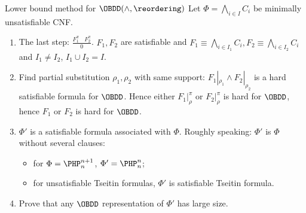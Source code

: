 \begin{frame}{Lower bound method for $\OBDD(\land, \reordering)$}
	Let $\Phi = \bigwedge\limits_{i \in I} C_i$ be minimally unsatisfiable CNF.
    \pause
    \begin{enumerate}
        \item The last step: $\frac{F_1^{\pi} ~~~~ F_2^{\pi}}{0}$. $F_1, F_2$ are satisfiable and
            $F_1 \equiv \bigwedge\limits_{i \in I_1} C_i, F_2 \equiv \bigwedge\limits_{i \in I_2} C_i$
            and $I_1 \neq I_2$, $I_1 \cup I_2 = I$.
        \pause
        \item Find partial substitution $\rho_1, \rho_2$ with same support: $F_1|_{\rho_1} \land
            F_2|_{\rho_2}$ is a hard satisfiable formula for $\OBDD$. Hence either $F_1|_{\rho}^{\pi}$ or
            $F_2|_{\rho}^{\pi}$ is hard for $\OBDD$, hence $F_1$ or $F_2$ is hard for $\OBDD$.
        \pause
        \item $\Phi'$ is a satisfiable formula associated with $\Phi$. Roughly speaking: $\Phi'$ is
            $\Phi$ without several clauses:
            \begin{itemize}
                \item for $\Phi = \PHP^{n + 1}_{n}$, $\Phi' = \PHP^{n}_{n}$;
                \item for unsatisfiable Tseitin formulas, $\Phi'$ is satisfiable Tseitin formula.
            \end{itemize}
        \item Prove that any $\OBDD$ representation of $\Phi'$ has large size.
        
    \end{enumerate}    
\end{frame}


